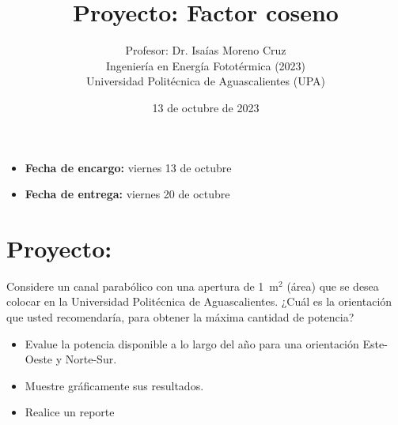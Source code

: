 \documentclass[spanish, letterpaper,12]{article}
\begin{document}
 
 
\title{Proyecto: Factor coseno}
\author{Profesor: Dr. Isaías Moreno Cruz\\
  Ingeniería en Energía Fototérmica (2023)\\
Universidad Politécnica de Aguascalientes (UPA)}
\date{13 de octubre de 2023}

\maketitle

\begin{itemize}[leftmargin=*, noitemsep]
\item \textbf{Fecha de encargo:} viernes 13 de octubre
\item \textbf{Fecha de entrega:} viernes 20 de octubre
\end{itemize}
\thispagestyle{fancy}

\section*{Proyecto:}

Considere un canal parabólico con una apertura de 1~m$^2$ (área) que se desea colocar en la Universidad Politécnica de Aguascalientes. ¿Cuál es la orientación que usted recomendaría, para obtener la máxima cantidad de potencia?

\begin{itemize}
\item Evalue la potencia disponible a lo largo del año para una orientación Este-Oeste y Norte-Sur.
\item Muestre gráficamente sus resultados.
\item Realice un reporte
\end{itemize}
\end{document}
